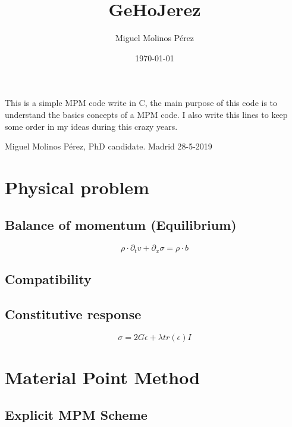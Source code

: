 \documentclass[11pt]{article}
\author{Miguel Molinos Pérez}
\date{\today}
\title{GeHoJerez}
\begin{document}
\maketitle
\tableofcontents

This is a simple MPM code write in C, the main purpose of this code is to understand the basics concepts of a MPM code. I also write this lines to keep some order in my ideas during this crazy years. 

Miguel Molinos Pérez, PhD candidate. Madrid 28-5-2019

\section{Physical problem}
\label{sec-1}

\subsection{Balance of momentum (Equilibrium)}
\label{sec-1-1}

\begin{equation}
\rho \cdot \partial_{t} v + \partial_{x} \sigma =  \rho \cdot b
\end{equation}



\subsection{Compatibility}
\label{sec-1-2}
\subsection{Constitutive response}
\label{sec-1-3}

\begin{equation}
\sigma = 2G\epsilon + \lambda tr(\epsilon) I
\end{equation}

\section{Material Point Method}
\label{sec-2}

\subsection{Explicit MPM Scheme}
\label{sec-2-1}
\end{document}
